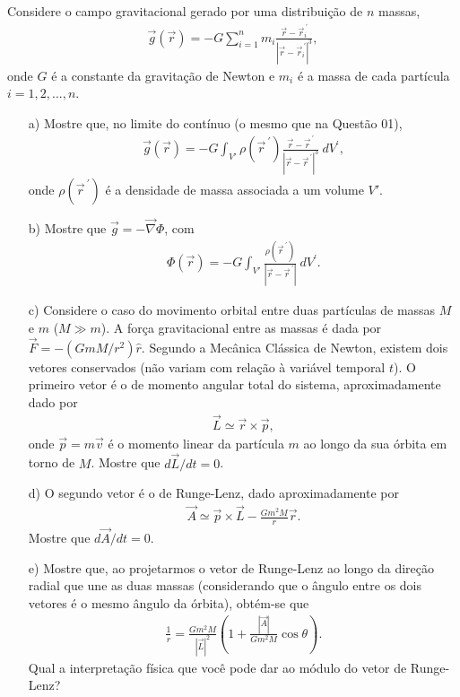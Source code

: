 \documentclass[a4paper,12pt]{article}
\begin{document}

\indent \par Considere o campo gravitacional gerado por uma distribuição de $n$ massas,
%
\begin{eqnarray}
\nonumber
\vec{g}(\vec{r}) = - G \sum_{i=1}^{n} m_{i} \frac{\vec{r}-\vec{r}^{~'}_{i}}{|\vec{r}-\vec{r}_{i}^{~'}|^{3}},
\end{eqnarray}
%
\noindent onde $G$ é a constante da gravitação de Newton e $m_i$ é a massa de cada partícula $i=1,2,...,n$. 
%
\begin{itemize}
 \item[a)] Mostre que, no limite do contínuo (o mesmo que na Questão 01),
\begin{eqnarray}
\nonumber
\vec{g}(\vec{r}) = -G \int_{V'} \rho(\vec{r}^{~'}) \frac{\vec{r}-\vec{r}^{~'}}{|\vec{r}-\vec{r}^{~'}|^{3}} ~dV^{'},
\end{eqnarray}
%
\noindent onde $\rho(\vec{r}^{~'})$ é a densidade de massa associada a um volume $V'$.
%
\item[b)] Mostre que $\vec{g}=-\vec{\nabla}\Phi$, com 
%
\begin{eqnarray}
\nonumber
\Phi(\vec{r}) = -G \int_{V'} \frac{\rho(\vec{r}^{~'})}{|\vec{r}-\vec{r}^{~'}|} ~dV^{'}.
\end{eqnarray}
%
\item[c)] Considere o caso do movimento orbital entre duas partículas de massas $M$ e $m$ ($M\gg m$). A força gravitacional entre as massas é dada por $\vec{F}=-(GmM/r^{2})\hat{r}$. Segundo a Mecânica Clássica de Newton, existem dois vetores conservados (não variam com relação à variável temporal $t$). O primeiro vetor é o de momento angular total do sistema, aproximadamente dado por 
%
\begin{eqnarray}
\nonumber
\vec{L} \simeq \vec{r} \times \vec{p},       
\end{eqnarray}
%
\noindent onde $\vec{p}=m\vec{v}$ é o momento linear da partícula $m$ ao longo da sua órbita em torno de $M$. Mostre que $d\vec{L}/dt = 0$.
%
\item[d)] O segundo vetor é o de Runge-Lenz, dado aproximadamente por
%
\begin{eqnarray}
\nonumber
\vec{A} \simeq \vec{p} \times \vec{L} - \frac{Gm^2M}{r}\vec{r}.       
\end{eqnarray}
%
\noindent Mostre que $d\vec{A}/dt = 0$.
%
\item[e)] Mostre que, ao projetarmos o vetor de Runge-Lenz ao longo da direção radial que une as duas massas (considerando que o ângulo entre os dois vetores é o mesmo ângulo da órbita), obtém-se que
%
\begin{eqnarray}
\nonumber
\frac{1}{r}= \frac{Gm^2M}{|\vec{L}|^2}\left( 1+\frac{|\vec{A}|}{Gm^2M}\cos\theta \right).       
\end{eqnarray}
\noindent Qual a interpretação física que você pode dar ao módulo do vetor de Runge-Lenz?\\
\end{itemize}
%
\end{document}
